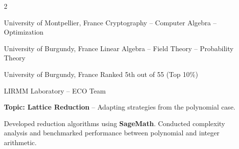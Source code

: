 \documentclass[10pt,a4paper,ragged2e,withhyper]{cv}
\newcommand{\kw}[1]{\textbf{\color{name}#1}}
\begin{document}
\begin{paracol}{2}
  \switchcolumn

  \makecvheaderleft


  \vspace{-0.3cm}

  \vfill

  {University of Montpellier, France}
  {}
  {Cryptography -- Computer Algebra -- Optimization}

  \vfill

  {University of Burgundy, France}
  {}
  {Linear Algebra -- Field Theory -- Probability Theory}

  \vfill

  {University of Burgundy, France}
  {}
  {Ranked 5th out of 55 (Top 10\%)}


  \vfill


  \vfill

  {LIRMM Laboratory -- ECO Team}{
  }
  {\vspace{0.05cm}

  \textbf{Topic: Lattice Reduction} -- Adapting strategies from the polynomial case.

  Developed reduction algorithms using \kw{SageMath}. Conducted complexity analysis and benchmarked performance between polynomial and integer arithmetic.

}
\end{paracol}
\end{document}
